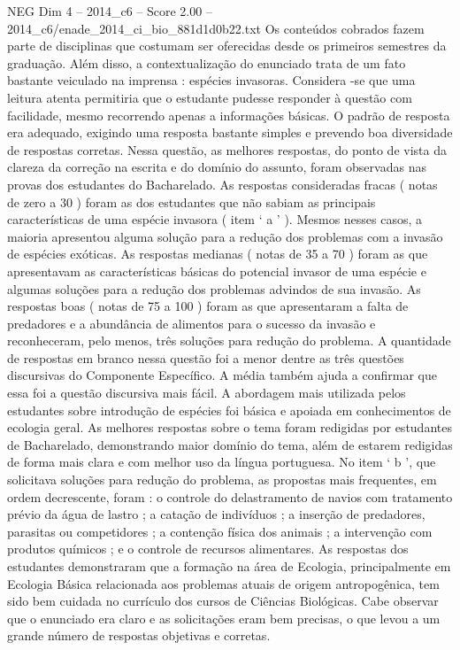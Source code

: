 \begin{textsample}{NEG Dim 4 – 2014\_c6 – Score 2.00 – 2014\_c6/enade\_2014\_ci\_bio\_881d1d0b22.txt}
Os conteúdos cobrados fazem parte de disciplinas que costumam ser oferecidas desde os primeiros semestres da graduação.
Além disso, a contextualização do enunciado trata de um fato bastante veiculado na imprensa : espécies invasoras.
Considera -se que uma leitura atenta permitiria que o estudante pudesse responder à questão com facilidade, mesmo recorrendo apenas a informações básicas.
O padrão de resposta era adequado, exigindo uma resposta bastante simples e prevendo boa diversidade de respostas corretas.
Nessa questão, as melhores respostas, do ponto de vista da clareza da correção na escrita e do domínio do assunto, foram observadas nas provas dos estudantes do Bacharelado.
As respostas consideradas fracas ( notas de zero a 30 ) foram as dos estudantes que não sabiam as principais características de uma espécie invasora ( item ‘ a ’ ).
Mesmos nesses casos, a maioria apresentou alguma solução para a redução dos problemas com a invasão de espécies exóticas.
As respostas medianas ( notas de 35 a 70 ) foram as que apresentavam as características básicas do potencial invasor de uma espécie e algumas soluções para a redução dos problemas advindos de sua invasão.
As respostas boas ( notas de 75 a 100 ) foram as que apresentaram a falta de predadores e a abundância de alimentos para o sucesso da invasão e reconheceram, pelo menos, três soluções para redução do problema.
A quantidade de respostas em branco nessa questão foi a menor dentre as três questões discursivas do Componente Específico.
A média também ajuda a confirmar que essa foi a questão discursiva mais fácil.
A abordagem mais utilizada pelos estudantes sobre introdução de espécies foi básica e apoiada em conhecimentos de ecologia geral.
As melhores respostas sobre o tema foram redigidas por estudantes de Bacharelado, demonstrando maior domínio do tema, além de estarem redigidas de forma mais clara e com melhor uso da língua portuguesa.
No item ‘ b ’, que solicitava soluções para redução do problema, as propostas mais frequentes, em ordem decrescente, foram : o controle do delastramento de navios com tratamento prévio da água de lastro ; a catação de indivíduos ; a inserção de predadores, parasitas ou competidores ; a contenção física dos animais ; a intervenção com produtos químicos ; e o controle de recursos alimentares.
As respostas dos estudantes demonstraram que a formação na área de Ecologia, principalmente em Ecologia Básica relacionada aos problemas atuais de origem antropogênica, tem sido bem cuidada no currículo dos cursos de Ciências Biológicas.
Cabe observar que o enunciado era claro e as solicitações eram bem precisas, o que levou a um grande número de respostas objetivas e corretas.

\end{textsample}
